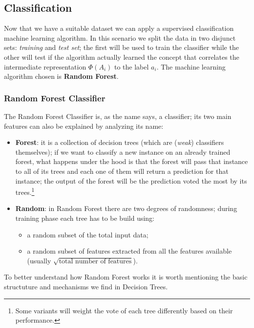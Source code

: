 \subsection{Classification}
Now that we have a suitable dataset we can apply a supervised classification machine learning algorithm. In this scenario we split the data in two disjunct sets: \textit{training} and \textit{test set}; the first will be used to train the classifier while the other will test if the algorithm actually learned the concept that correlates the intermediate representation $\Phi(A_i)$ to the label $a_i$. The machine learning algorithm chosen is \textbf{Random Forest}.

\subsubsection{Random Forest Classifier}
\label{subsubsec:rfc}
The Random Forest Classifier is, as the name says, a classifier; its two main features can also be explained by analyzing its name:
\begin{itemize}
 \item \textbf{Forest}: it is a collection of decision trees (which are (\textit{weak}) classifiers themselves); if we want to classify a new instance on an already trained forest, what happens under the hood is that the forest will pass that instance to all of its trees and each one of them will return a prediction for that instance; the output of the forest will be the prediction voted the most by its trees.\footnote{Some variants will weight the vote of each tree differently based on their performance.}
 \item \textbf{Random}: in Random Forest there are two degrees of randomness; during training phase each tree has to be build using:
 \begin{itemize}
  \item a random subset of the total input data;
  \item a random subset of features extracted from all the features available (usually $\sqrt{\text{total number of features}}$).
 \end{itemize}
\end{itemize}

To better understand how Random Forest works it is worth mentioning the basic structuture and mechanisms we find in Decision Trees. 

